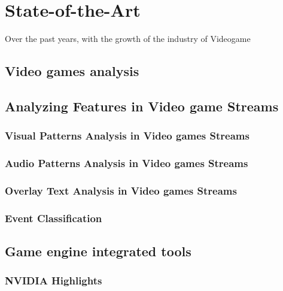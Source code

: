 \section{State-of-the-Art}
Over the past years, with the growth of the industry of Videogame
\subsection{Video games analysis}  %

\subsection{Analyzing Features in Video game Streams}
\subsubsection{Visual Patterns Analysis in Video games Streams}
\subsubsection{Audio Patterns Analysis in Video games Streams}
\subsubsection{Overlay Text Analysis in Video games Streams}
\subsubsection{Event Classification}

\subsection{Game engine integrated tools}
\subsubsection{NVIDIA Highlights}




